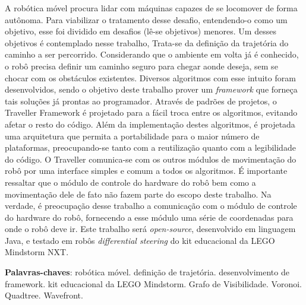 \begin{resumo}
A robótica móvel procura lidar com máquinas capazes de se locomover de forma autônoma. Para viabilizar o tratamento desse desafio, entendendo-o como um objetivo, esse foi dividido em desafios (lê-se objetivos) menores. Um desses objetivos é contemplado nesse trabalho, Trata-se da definição da trajetória do caminho a ser percorrido. Considerando que o ambiente em volta já é conhecido, o robô precisa definir um caminho seguro para chegar aonde deseja, sem se chocar com os obstáculos existentes. Diversos algoritmos com esse intuito foram desenvolvidos, sendo o objetivo deste trabalho prover um \textit{framework} que forneça tais soluções já prontas ao programador. Através de padrões de projetos, o Traveller Framework é projetado para a fácil troca entre os algoritmos, evitando afetar o resto do código. Além da implementação destes algoritmos, é projetada uma arquitetura que permita a portabilidade para o maior número de plataformas, preocupando-se tanto com a reutilização quanto com a legibilidade do código. O Traveller comunica-se com os outros módulos de movimentação do robô por uma interface simples e comum a todos os algoritmos. É importante ressaltar que o módulo de controle do hardware do robô bem como a movimentação dele de fato não fazem parte do escopo deste trabalho. Na verdade, é preocupação desse trabalho a comunicação com o módulo de controle do hardware do robô, fornecendo a esse módulo uma série de coordenadas para onde o robô deve ir. Este trabalho será \textit{open-source}, desenvolvido em linguagem Java, e testado em robôs \textit{differential steering} do kit educacional da LEGO Mindstorm NXT.

 \vspace{\onelineskip}
    
 \noindent
 \textbf{Palavras-chaves}: robótica móvel. definição de trajetória. desenvolvimento de framework. kit educacional da LEGO Mindstorm. Grafo de Visibilidade. Voronoi. Quadtree. Wavefront.
\end{resumo}
